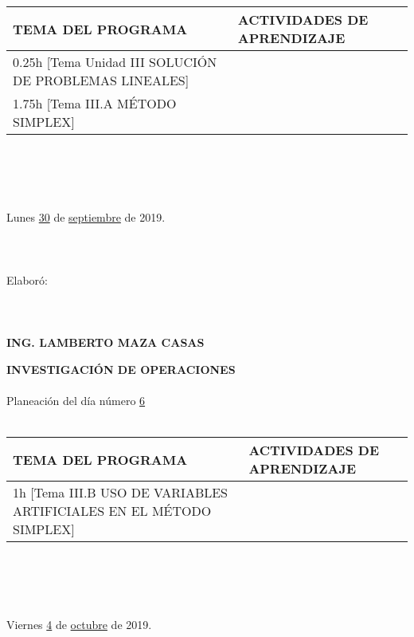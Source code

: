 \documentclass[landscape]{article}
\begin{document}
{\begin{center}
\begin{tabular}{|p{11cm}|p{8cm}|}
{\bf TEMA DEL PROGRAMA}&{\bf ACTIVIDADES DE APRENDIZAJE}\\\hline
	0.25h	[Tema Unidad III SOLUCI\'ON DE PROBLEMAS LI\-NEA\-LES]
&\\
	1.75h	[Tema III.A M\'ETODO SIMPLEX]
&\\
\hline
\end{tabular}
\ \\
\ \\
\ \\
\ \\
Lunes \underline{\hspace{0.5cm}30\hspace{0.5cm}} de  \underline{\hspace{0.5cm}septiembre\hspace{0.5cm}} de 2019.
\ \\
\ \\
\ \\
\ \\
Elabor\'o:
\ \\
\ \\
\ \\
\ \\
{\bf ING. LAMBERTO MAZA CASAS}
\end{center}
\eject
\begin{center}
{\bf 
INVESTIGACI\'ON DE OPERACIONES
}
\ \\
\ \\
Planeaci\'on del d\'ia n\'umero \underline{\hspace{0.5cm}6\hspace{0.5cm}}
\ \\
\ \\
\begin{tabular}{|p{11cm}|p{8cm}|}\hline
{\bf TEMA DEL PROGRAMA}&{\bf ACTIVIDADES DE APRENDIZAJE}\\\hline
	1h	[Tema III.B USO DE VARIABLES ARTIFICIALES EN EL M\'ETODO SIMPLEX]
&\\
\hline
\end{tabular}
\ \\
\ \\
\ \\
\ \\
Viernes \underline{\hspace{0.5cm}4\hspace{0.5cm}} de  \underline{\hspace{0.5cm}octubre\hspace{0.5cm}} de 2019.
\ \\
\ \\
\ \\

\end{center}}
\end{document}
